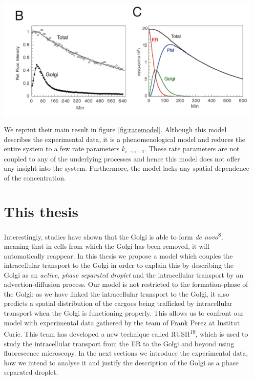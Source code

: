 \documentclass{Dissertate}
\let\origfigure\figure
\let\endorigfigure\endfigure
\renewenvironment{figure}[1][2] {
    \expandafter\origfigure\expandafter[H]
} {
    \endorigfigure
}
\begin{document}
\begin{figure}
\hypertarget{fig:ratemodel}{%
\centering
\includegraphics{source/figures/png/kineticmodel.png}
\caption{\textbf{Left panel}: First order rate model fitted to
experimental data by 15 \textbf{Right panel}: Inferred concentration in
ER, Golgi and PM using the fitted parameters from the left panel and
their model. Image reprinted from 15.}\label{fig:ratemodel}
}
\end{figure}

We reprint their main result in figure \ref{fig:ratemodel}.
Although this model describes the experimental data, it is a
phenomenological model and reduces the entire system to a few rate
parameters \(k_{i\to i+1}\). These rate parameters are not coupled to
any of the underlying processes and hence this model does not offer any
insight into the system. Furthermore, the model lacks any spatial
dependence of the concentration.

\hypertarget{this-thesis}{%
\section{This thesis}\label{this-thesis}}
Interestingly, studies have shown that the Golgi is able to form \emph{de novo}\textsuperscript{8}, meaning
that in cells from which the Golgi has been removed, it will automatically reappear. In this thesis we propose a model which couples the intracellular transport
to the Golgi in order to explain this by describing the Golgi as an \emph{active, phase separated droplet} and the intracellular transport by an advection-diffusion process. Our model is not restricted to the formation-phase of the Golgi: as we have linked the intracellular transport to the Golgi, it also predicts a spatial distribution of the cargoes being trafficked by intracellular transport when the Golgi is functioning properly. 
This allows us to confront our model with experimental data gathered by the team of Frank Perez at Institut Curie. This team has developed a new technique called RUSH\textsuperscript{16}, which is used to study the intracellular transport from the ER to the Golgi and
beyond using fluorescence microscopy. In the next sections we introduce the experimental data, how we intend to analyse it and justify
the description of the Golgi as a phase separated droplet.
\end{document}

